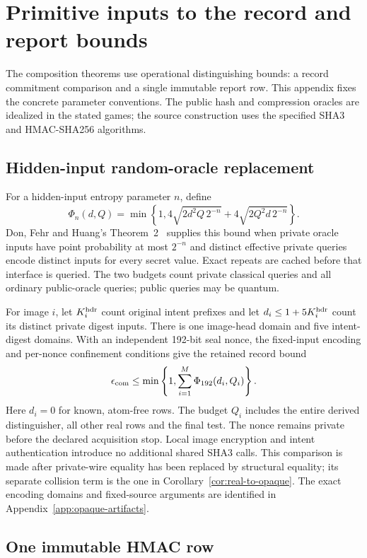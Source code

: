\section{Primitive inputs to the record and report bounds}
\label{app:primitive-inputs}

The composition theorems use operational distinguishing bounds: a record
commitment comparison and a single immutable report row. This appendix fixes
the concrete parameter conventions. The public hash and compression oracles
are idealized in the stated games; the source construction uses the specified
SHA3 and HMAC-SHA256 algorithms.

\subsection{Hidden-input random-oracle replacement}

For a hidden-input entropy parameter $n$, define
\[
 \Phi_n(d,Q)=\min\!\left\{1,
 4\sqrt{2d^2Q\,2^{-n}}+4\sqrt{2Q^2d\,2^{-n}}\right\}.
\]
Don, Fehr and Huang's Theorem~2~\cite{dfh2022} supplies this bound when
private oracle inputs have point probability at most $2^{-n}$ and distinct
effective private queries encode distinct inputs for every secret value.
Exact repeats are cached before that interface is queried. The two budgets
count private classical queries and all ordinary public-oracle queries;
public queries may be quantum.

For image $i$, let $K_i^{\rm hdr}$ count original intent prefixes and let
$d_i\le1+5K_i^{\rm hdr}$ count its distinct private digest inputs. There is
one image-head domain and five intent-digest domains. With an independent
192-bit seal nonce, the fixed-input encoding and per-nonce confinement
conditions give the retained record bound
\[
 \epsilon_{\rm com}
 \le\min\left\{1,\sum_{i=1}^{M}\Phi_{192}(d_i,Q_i)\right\}.
\]
Here $d_i=0$ for known, atom-free rows. The budget $Q_i$ includes the
entire derived distinguisher, all other real rows and the final test.
The nonce remains private before the declared acquisition stop. Local
image encryption and intent authentication introduce no additional shared
SHA3 calls. This comparison is made after private-wire equality has been
replaced by structural equality; its separate collision term is the one in
Corollary~\ref{cor:real-to-opaque}. The exact encoding domains and fixed-source
arguments are identified in Appendix~\ref{app:opaque-artifacts}.

\subsection{One immutable HMAC row}

